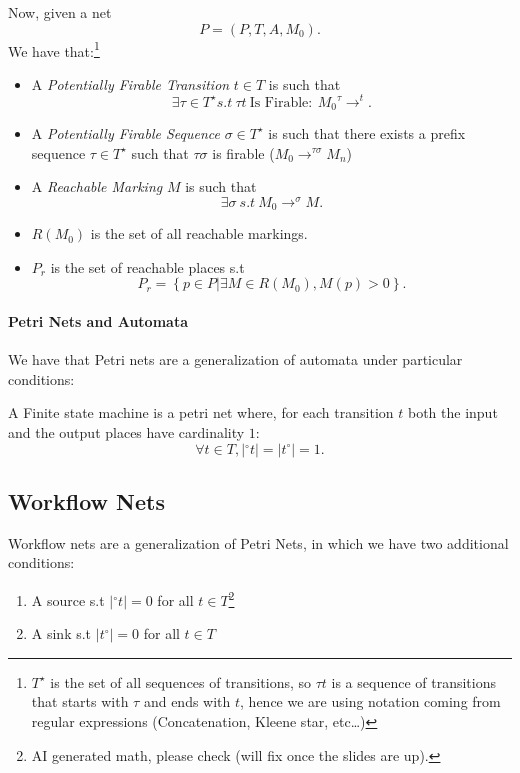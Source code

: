 \documentclass[openright, twoside, twocolumn, a4paper, 10pt]{report}
\begin{document}
Now, given a net \[
	P = (P, T, A, M_0).\] We have that:\footnote{
	$T^{\star}$ is the set of all sequences of transitions, so $\tau t$ is a sequence of transitions
	that starts with $\tau$ and ends with $t$, hence we are using notation coming from regular expressions (Concatenation, Kleene star, etc\dots)
}
\begin{itemize}
	\item A \emph{Potentially Firable Transition}  $t \in T$  is such that
	      \[
		      \exists \tau \in T^{\star} s.t\ \tau t\ \text{Is Firable}:\ M_0 {}^{\tau}\to^{t}
		      .\]
	\item A \emph{Potentially Firable Sequence} $\sigma \in T^{\star}$ is such that
	      there exists a prefix sequence $\tau \in T^{\star}$ such that $\tau \sigma$ is firable ($M_0 \to^{\tau \sigma} M_n$)
	\item A \emph{Reachable Marking} $M$ is such that
	      \[
		      \exists \sigma\ s.t\ M_0 \to^{\sigma} M
		      .\]
	\item $R( M_0)$ is the set of all reachable markings.
	\item $P_r$ is the set of reachable places s.t
	      \[
		      P_r = \left\{ p \in  P | \exists  M \in  R( M_0), M(p) > 0 \right\}
		      .\]
\end{itemize}

\paragraph{Petri Nets and Automata}

We have that Petri nets are a generalization of automata under particular conditions:

\begin{definition}
	A Finite state machine is a petri net where, for each transition $t$ both
	the input and the output places have cardinality $1$:
	\[
		\forall  t \in  T, |{}^{\circ}t| = |t^{\circ}| = 1
		.\]
\end{definition}

\subsection{Workflow Nets}

Workflow nets are a generalization of Petri Nets, in which we have two additional conditions:

\begin{enumerate}
	\item A source s.t $|{}^{\circ}t| = 0$ for all $t \in T$\footnote{
		      AI generated math, please check (will fix once the slides are up).
	      }
	\item A sink s.t $|t^{\circ}| = 0$ for all $t \in T$
\end{enumerate}
\end{document}
